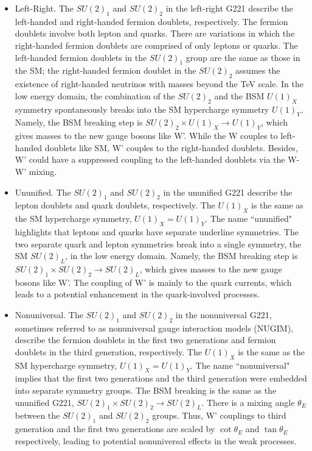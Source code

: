 \begin{itemize}
    \item Left-Right. The $SU(2)_1$ and $SU(2)_2$ in the left-right G221 describe the left-handed and right-handed fermion doublets, respectively. The fermion doublets involve both lepton and quarks. There are variations in which the right-handed fermion doublets are comprised of only leptons or quarks. The left-handed fermion doublets in the $SU(2)_1$ group are the same as those in the SM; the right-handed fermion doublet in the $SU(2)_2$ assumes the existence of right-handed neutrinos with masses beyond the TeV scale. In the low energy domain, the combination of the $SU(2)_2$ and the BSM $U(1)_X$ symmetry spontaneously breaks into the SM hypercharge symmetry $U(1)_Y$. Namely, the BSM breaking step is $SU(2)_2 \times U(1)_X  \to U(1)_Y$, which gives masses to the new gauge bosons like W'. While the W couples to left-handed doublets like SM, W' couples to the right-handed doublets. Besides, W' could have a suppressed coupling to the left-handed doublets via the W-W' mixing. 
    
    \item Ununified. The $SU(2)_1$ and $SU(2)_2$ in the ununified G221 describe the lepton doublets and quark doublets, respectively. The $U(1)_X$ is the same as the SM hypercharge symmetry,  $U(1)_X=U(1)_Y$. The name ``ununified" highlights that leptons and quarks have separate underline symmetries. The two separate quark and lepton symmetries break into a single symmetry, the SM $SU(2)_L$, in the low energy domain. Namely, the BSM breaking step is $SU(2)_1 \times SU(2)_2 \to SU(2)_L$, which gives masses to the new gauge bosons like W'. The coupling of W' is mainly to the quark currents, which leads to a potential enhancement in the quark-involved processes.

    \item Nonuniversal. The $SU(2)_1$ and $SU(2)_2$ in the nonuniversal G221, sometimes referred to as nonuniversal gauge interaction models (NUGIM), describe the fermion doublets in the first two generations and fermion doublets in the third generation, respectively. The $U(1)_X$ is the same as the SM hypercharge symmetry,  $U(1)_X=U(1)_Y$. The name ``nonuniversal" implies that the first two generations and the third generation were embedded into separate symmetry groups. The BSM breaking is the same as the ununified G221, $SU(2)_1 \times SU(2)_2 \to SU(2)_L$. There is a mixing angle $\theta_E$ between the $SU(2)_1$ and $SU(2)_2$ groups. Thus, W' couplings to third generation and the first two generations are scaled by $\cot \theta_E$ and $\tan \theta_E$ respectively, leading to potential nonuniversal effects in the weak processes.
\end{itemize}




